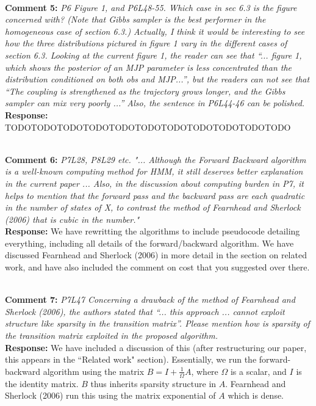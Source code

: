 \documentclass[11pt]{article}
\newcommand{\rev}[2]{\textbf{Comment #1: }\emph{#2}}
\newcommand{\resp}{\textbf{Response: }}
\begin{document}
~\\ 
\rev{5}{P6 Figure 1, and P6L48-55. Which case in sec 6.3 is the figure concerned with? (Note that Gibbs sampler is the best performer in the homogeneous case of section 6.3.) Actually, I think it would be interesting to see how the three distributions pictured in figure 1 vary in the different cases of section 6.3. Looking at the current figure 1, the reader can see that “... figure 1, which shows the posterior of an MJP parameter is less concentrated than the distribution conditioned on both obs and MJP...”, but the readers can not see that “The coupling is strengthened as the trajectory grows longer, and the Gibbs sampler can mix very poorly ...” 
Also, the sentence in P6L44-46 can be polished.}\\
\resp{TODOTODOTODOTODOTODOTODOTODOTODOTODOTODOTODO}

~\\
\noindent \rev{6}{P7L28, P8L29 etc. "... Although the Forward Backward algorithm is a well-known computing method for HMM, it still deserves better explanation in the current paper ...  Also, in the discussion about computing burden in P7, it helps to mention that the forward pass and the backward pass are each quadratic in the number of states of X, to contrast the method of Fearnhead and Sherlock (2006) that is cubic in the number."}
\\ 
\resp{We have rewritting the algorithms to include pseudocode detailing everything, including all details of the forward/backward algorithm. We have discussed Fearnhead and Sherlock (2006) in more detail in the section on related work, and have also included the comment on cost that you suggested over there.} 

~\\
\noindent \rev{7}{P7L47 Concerning a drawback of the method of Fearnhead and Sherlock (2006), the authors stated that “... this approach ... cannot exploit structure like sparsity in the transition matrix”. Please mention how is sparsity of the transition matrix exploited in the proposed algorithm.}
\\
\resp{We have included a discussion of this (after restructuring our paper, this appears in the ``Related work" section). Essentially, we run the forward-backward algorithm using the matrix $B = I + \frac{1}{\Omega}A$, where $\Omega$ is a scalar, and $I$ is the identity matrix. $B$ thus inherits sparsity structure in $A$. Fearnhead and Sherlock (2006) run this using the matrix exponential of $A$ which is dense.}
\end{document}
